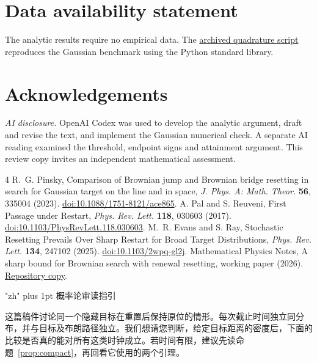 \documentclass[11pt]{article}
\begin{document}
\section*{Data availability statement}
The analytic results require no empirical data. The
\href{https://github.com/daemonx666/math-physics-notes/blob/6a3f7da7459bd6e68c4d10f60bde20e3f0539092/papers/gaussian-periodic-resetting/verify.py}{archived quadrature script}
reproduces the Gaussian benchmark using the Python standard library.

\section*{Acknowledgements}
\emph{AI disclosure.} OpenAI Codex was used to develop the analytic
argument, draft and revise the text, and implement the Gaussian numerical
check. A separate AI reading examined the threshold, endpoint signs and
attainment argument. This review copy invites an independent mathematical
assessment.

\begin{thebibliography}{4}
 R.~G. Pinsky, Comparison of Brownian jump and Brownian
bridge resetting in search for Gaussian target on the line and in space,
\emph{J. Phys. A: Math. Theor.} \textbf{56}, 335004 (2023).
\href{https://doi.org/10.1088/1751-8121/ace865}{doi:10.1088/1751-8121/ace865}.
 A. Pal and S. Reuveni, First Passage under Restart,
\emph{Phys. Rev. Lett.} \textbf{118}, 030603 (2017).
\href{https://doi.org/10.1103/PhysRevLett.118.030603}{doi:10.1103/PhysRevLett.118.030603}.
 M.~R. Evans and S. Ray, Stochastic Resetting Prevails Over
Sharp Restart for Broad Target Distributions, \emph{Phys. Rev. Lett.}
\textbf{134}, 247102 (2025).
\href{https://doi.org/10.1103/2wpq-gl2j}{doi:10.1103/2wpq-gl2j}.
 Mathematical Physics Notes, A sharp bound for Brownian
search with renewal resetting, working paper (2026).
\href{https://github.com/daemonx666/math-physics-notes/blob/92bc9bc972a7755d4cc9ff2c768b29f5155a4621/papers/brownian-resetting/paper.pdf}{Repository copy}.
\end{thebibliography}
\clearpage
{}\hypertarget{reviewguide}{}
\begingroup
\reviewzh\fontsize{12pt}{19pt}\selectfont\XeTeXlinebreaklocale "zh"\relax
\XeTeXlinebreakskip=0pt plus 1pt\relax
\setlength{\parindent}{0pt}\setlength{\parskip}{9pt}
{\Large 概率论审读指引}\par
这篇稿件讨论同一个隐藏目标在重置后保持原位的情形。每次截止时间独立同分布，并与目标及布朗路径独立。我们想请您判断，给定目标距离的密度后，下面的比较是否真的能对所有这类时钟成立。若时间有限，建议先读命题~\ref{prop:compact}，再回看它使用的两个引理。
\end{document}
